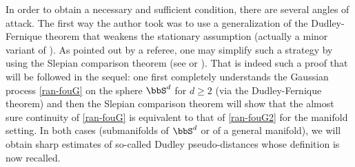 In order to obtain a necessary and sufficient condition, there are several angles of attack.
The first way the author took was to use a generalization of the Dudley-Fernique theorem that weakens the stationary assumption (actually a minor variant of \cite[Th.\,2.7.4, p.\,61]{dudley2014}). As pointed out by a referee, one may simplify such a strategy by using the Slepian comparison theorem
(see \cite[Cor.\,3.14]{ledoux} or \cite[p.\,73]{queff2}).
That is indeed such a proof that will be followed in the sequel: one first completely understands the Gaussian process \eqref{ran-fouG} on the sphere $\bbS^d$ for $d\geq 2$ (via the Dudley-Fernique theorem) and then the Slepian comparison theorem will show that the almost sure continuity of \eqref{ran-fouG} is equivalent to that of \eqref{ran-fouG2} for the manifold setting. In both cases (submanifolds of $\bbS^d$ or of a general manifold), we will obtain sharp estimates of so-called Dudley pseudo-distances whose definition is now recalled.

